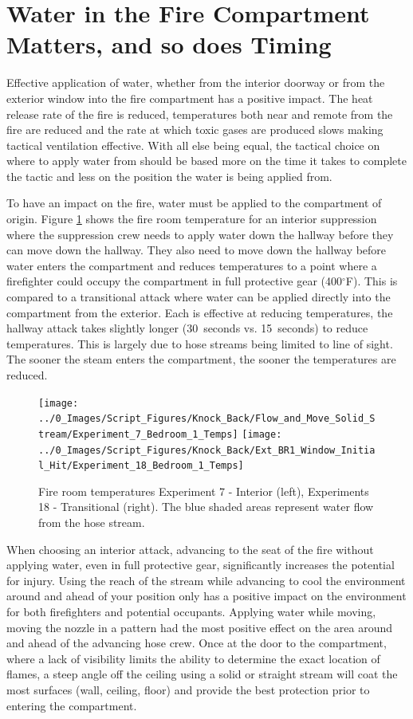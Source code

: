 \documentclass[12pt,oneside]{book}
\begin{document}
\section{Water in the Fire Compartment Matters, and so does Timing} \label{tc:water_in_compartment_and_time}
Effective application of water, whether from the interior doorway or from the exterior window into the fire compartment has a positive impact. The heat release rate of the fire is reduced, temperatures both near and remote from the fire are reduced and the rate at which toxic gases are produced slows making tactical ventilation effective. With all else being equal, the tactical choice on where to apply water from should be based more on the time it takes to complete the tactic and less on the position the water is being applied from.

To have an impact on the fire, water must be applied to the compartment of origin. Figure \ref{fig:water_app_dir_TC_temp_reduce} shows the fire room temperature for an interior suppression where the suppression crew needs to apply water down the hallway before they can move down the hallway. They also need to move down the hallway before water enters the compartment and reduces temperatures to a point where a firefighter could occupy the compartment in full protective gear (400$^\circ$F). This is compared to a transitional attack where water can be applied directly into the compartment from the exterior. Each is effective at reducing temperatures, the hallway attack takes slightly longer (30~seconds vs. 15~seconds) to reduce temperatures. This is largely due to hose streams being limited to line of sight. The sooner the steam enters the compartment, the sooner the temperatures are reduced.

\begin{figure}[H]
\centering
\texttt{[image: ../0\_Images/Script\_Figures/Knock\_Back/Flow\_and\_Move\_Solid\_Stream/Experiment\_7\_Bedroom\_1\_Temps]}
\texttt{[image: ../0\_Images/Script\_Figures/Knock\_Back/Ext\_BR1\_Window\_Initial\_Hit/Experiment\_18\_Bedroom\_1\_Temps]}
\caption[Window vs. Hallway Water Application - Single Room Fire, Window Vent]{Fire room temperatures Experiment 7 - Interior (left), Experiments 18 - Transitional (right). The blue shaded areas represent water flow from the hose stream.}
\label{fig:water_app_dir_TC_temp_reduce}
\end{figure}

When choosing an interior attack, advancing to the seat of the fire without applying water, even in full protective gear, significantly increases the potential for injury. Using the reach of the stream while advancing to cool the environment around and ahead of your position only has a positive impact on the environment for both firefighters and potential occupants. Applying water while moving, moving the nozzle in a pattern had the most positive effect on the area around and ahead of the advancing hose crew. Once at the door to the compartment, where a lack of visibility limits the ability to determine the exact location of flames, a steep angle off the ceiling using a solid or straight stream will coat the most surfaces (wall, ceiling, floor) and provide the best protection prior to entering the compartment. 
\end{document}

